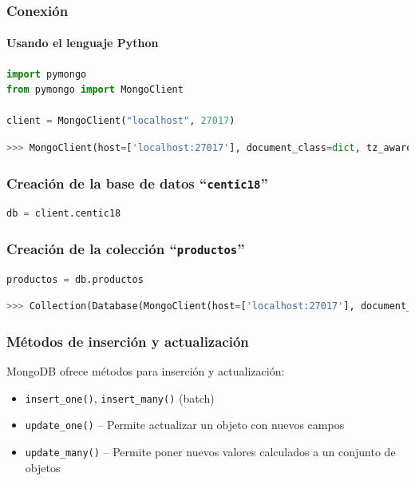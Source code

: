 \documentclass[14pt]{beamer}
\begin{document}
\begin{frame}[fragile]
  \frametitle{Conexión}
  \framesubtitle{Usando el lenguaje Python}
\begin{lstlisting}[language=python,basicstyle=\tt]
import pymongo
from pymongo import MongoClient

client = MongoClient("localhost", 27017)
\end{lstlisting}

\begin{lstlisting}[language=python]
>>> MongoClient(host=['localhost:27017'], document_class=dict, tz_aware=False, connect=True)
\end{lstlisting}
\end{frame}

\begin{frame}[fragile]
  \frametitle{Creación de la base de datos ``{\tt centic18}''}
\begin{lstlisting}[language=python,basicstyle=\tt]
db = client.centic18
\end{lstlisting}
\end{frame}

\begin{frame}[fragile]
  \frametitle{Creación de la colección ``{\tt productos}''}
\begin{lstlisting}[language=python,basicstyle=\tt]
productos = db.productos
\end{lstlisting}
\begin{lstlisting}[language=python]
>>> Collection(Database(MongoClient(host=['localhost:27017'], document_class=dict, tz_aware=False, connect=True), 'centic18'), 'productos')
\end{lstlisting}
\end{frame}

\begin{frame}
  \frametitle{Métodos de inserción y actualización}
  MongoDB ofrece métodos para inserción y actualización:
    \begin{itemize}
    \item {\tt insert\_one()}, {\tt insert\_many()} (batch)
    \item {\tt update\_one()} -- Permite actualizar un objeto con nuevos
      campos
    \item {\tt update\_many()} -- Permite poner nuevos valores calculados a
      un conjunto de objetos
    \end{itemize}
\end{frame}
\end{document}
